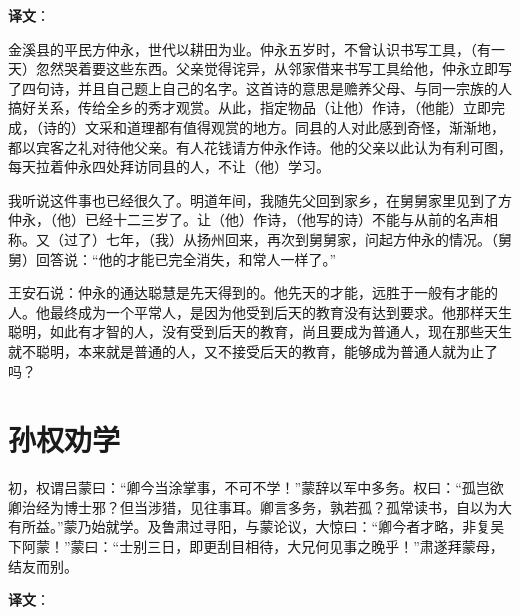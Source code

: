 \documentclass[12pt,UTF-8,openany,a4]{ctexbook}
\begin{document}
\newpage

\begin{Large}
   \noindent \textbf{译文}：
\end{Large}

\vspace{1em}

\begin{large}\yiwen
    
    金溪县的平民方仲永，世代以耕田为业。仲永五岁时，不曾认识书写工具，（有一天）忽然哭着要这些东西。父亲觉得诧异，从邻家借来书写工具给他，仲永立即写了四句诗，并且自己题上自己的名字。这首诗的意思是赡养父母、与同一宗族的人搞好关系，传给全乡的秀才观赏。从此，指定物品（让他）作诗，（他能）立即完成，（诗的）文采和道理都有值得观赏的地方。同县的人对此感到奇怪，渐渐地，都以宾客之礼对待他父亲。有人花钱请方仲永作诗。他的父亲以此认为有利可图，每天拉着仲永四处拜访同县的人，不让（他）学习。
    
    我听说这件事也已经很久了。明道年间，我随先父回到家乡，在舅舅家里见到了方仲永，（他）已经十二三岁了。让（他）作诗，（他写的诗）不能与从前的名声相称。又（过了）七年，（我）从扬州回来，再次到舅舅家，问起方仲永的情况。（舅舅）回答说：“他的才能已完全消失，和常人一样了。”
    
    王安石说：仲永的通达聪慧是先天得到的。他先天的才能，远胜于一般有才能的人。他最终成为一个平常人，是因为他受到后天的教育没有达到要求。他那样天生聪明，如此有才智的人，没有受到后天的教育，尚且要成为普通人，现在那些天生就不聪明，本来就是普通的人，又不接受后天的教育，能够成为普通人就为止了吗？
    

\end{large}



\chapter{孙权劝学}

\begin{large}
    
    初，权谓吕蒙曰：“卿今当涂掌事，不可不学！”蒙辞以军中多务。权曰：“孤岂欲卿治经为博士邪？但当涉猎，见往事耳。卿言多务，孰若孤？孤常读书，自以为大有所益。”蒙乃始就学。及鲁肃过寻阳，与蒙论议，大惊曰：“卿今者才略，非复吴下阿蒙！”蒙曰：“士别三日，即更刮目相待，大兄何见事之晚乎！”肃遂拜蒙母，结友而别。

\end{large}


\newpage

\begin{Large}
   \noindent \textbf{译文}：
\end{Large}
\end{document}
